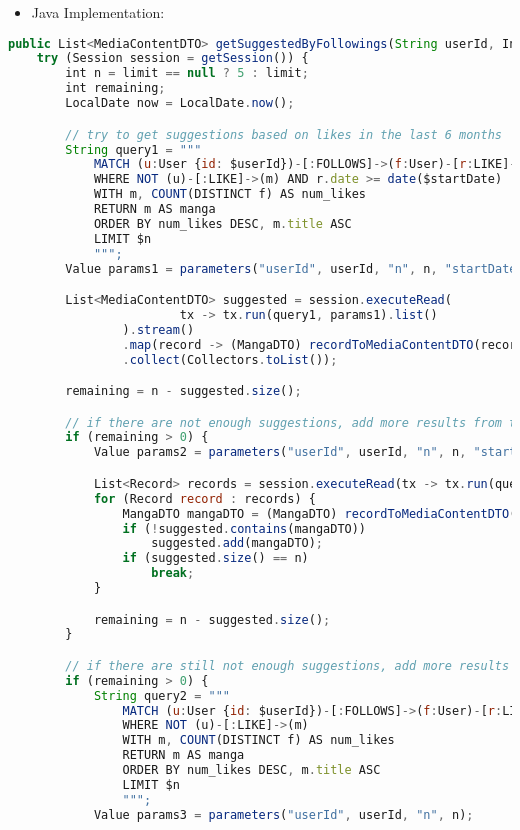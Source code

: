 \begin{itemize}
    \item Java Implementation:
\end{itemize}
\begin{lstlisting}[language=JavaScript]
public List<MediaContentDTO> getSuggestedByFollowings(String userId, Integer limit) throws DAOException {
    try (Session session = getSession()) {
        int n = limit == null ? 5 : limit;
        int remaining;
        LocalDate now = LocalDate.now();

        // try to get suggestions based on likes in the last 6 months
        String query1 = """
            MATCH (u:User {id: $userId})-[:FOLLOWS]->(f:User)-[r:LIKE]->(m:Manga)
            WHERE NOT (u)-[:LIKE]->(m) AND r.date >= date($startDate)
            WITH m, COUNT(DISTINCT f) AS num_likes
            RETURN m AS manga
            ORDER BY num_likes DESC, m.title ASC
            LIMIT $n
            """;
        Value params1 = parameters("userId", userId, "n", n, "startDate", now.minusMonths(6));

        List<MediaContentDTO> suggested = session.executeRead(
                        tx -> tx.run(query1, params1).list()
                ).stream()
                .map(record -> (MangaDTO) recordToMediaContentDTO(record))
                .collect(Collectors.toList());

        remaining = n - suggested.size();

        // if there are not enough suggestions, add more results from the last 2 years
        if (remaining > 0) {
            Value params2 = parameters("userId", userId, "n", n, "startDate", now.minusYears(2));

            List<Record> records = session.executeRead(tx -> tx.run(query1, params2).list());
            for (Record record : records) {
                MangaDTO mangaDTO = (MangaDTO) recordToMediaContentDTO(record);
                if (!suggested.contains(mangaDTO))
                    suggested.add(mangaDTO);
                if (suggested.size() == n)
                    break;
            }

            remaining = n - suggested.size();
        }

        // if there are still not enough suggestions, add more results based on all likes
        if (remaining > 0) {
            String query2 = """
                MATCH (u:User {id: $userId})-[:FOLLOWS]->(f:User)-[r:LIKE]->(m:Manga)
                WHERE NOT (u)-[:LIKE]->(m)
                WITH m, COUNT(DISTINCT f) AS num_likes
                RETURN m AS manga
                ORDER BY num_likes DESC, m.title ASC
                LIMIT $n
                """;
            Value params3 = parameters("userId", userId, "n", n);


\end{lstlisting}
